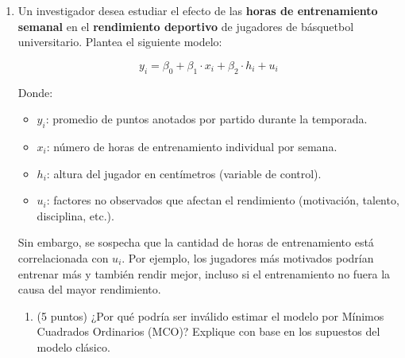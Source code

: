 \documentclass[10pt,a4paper]{article}
\begin{document}
\begin{enumerate}
  Testee con un 1\% de significancia si el tipo cambio nominal tiene raíz unitaria. Explique su resultado.  


 \item Un investigador desea estudiar el efecto de las \textbf{horas de entrenamiento semanal} en el \textbf{rendimiento deportivo} de jugadores de básquetbol universitario. Plantea el siguiente modelo:

 
\[
y_i = \beta_0 + \beta_1 \cdot x_i + \beta_2 \cdot h_i + u_i
\]

Donde:
\begin{itemize}
    \item $y_i$: promedio de puntos anotados por partido durante la temporada.
    \item $x_i$: número de horas de entrenamiento individual por semana. 
    \item $h_i$: altura del jugador en centímetros (variable de control). 
    \item $u_i$: factores no observados que afectan el rendimiento (motivación, talento, disciplina, etc.).
\end{itemize}



Sin embargo, se sospecha que la cantidad de horas de entrenamiento está correlacionada con $u_i$. Por ejemplo, los jugadores más motivados podrían entrenar más y también rendir mejor, incluso si el entrenamiento no fuera la causa del mayor rendimiento.


\begin{enumerate}
    \item (5 puntos) ¿Por qué podría ser inválido estimar el modelo por Mínimos Cuadrados Ordinarios (MCO)? Explique con base en los supuestos del modelo clásico.\\



\end{enumerate}
\end{enumerate}
\end{document}
